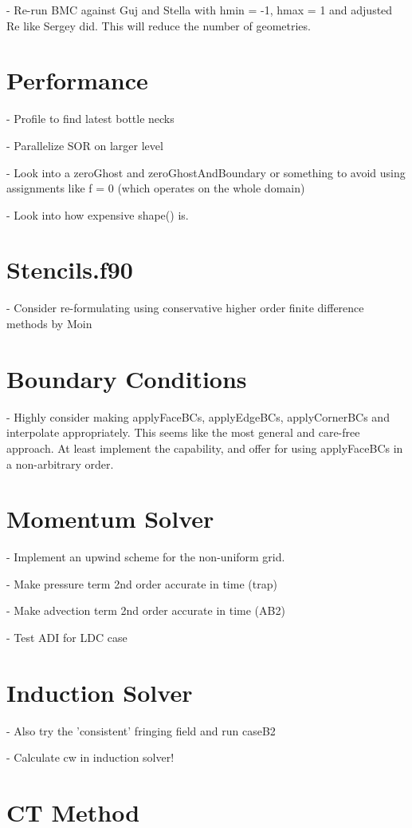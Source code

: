 \documentclass[11pt]{article}
\begin{document}
- Re-run BMC against Guj and Stella with hmin = -1, hmax = 1 and adjusted Re like Sergey
  did. This will reduce the number of geometries.

\section{Performance}
- Profile to find latest bottle necks

- Parallelize SOR on larger level

- Look into a zeroGhost and zeroGhostAndBoundary or something to avoid using assignments like f = 0 (which operates on the whole domain)

- Look into how expensive shape() is.


\section{Stencils.f90}
- Consider re-formulating using conservative higher order finite difference methods by Moin

\section{Boundary Conditions}
- Highly consider making applyFaceBCs, applyEdgeBCs, applyCornerBCs and interpolate appropriately. This seems like the most general and care-free approach. At least implement the capability, and offer for using applyFaceBCs in a non-arbitrary order.

\section{Momentum Solver}

- Implement an upwind scheme for the non-uniform grid.

- Make pressure term 2nd order accurate in time (trap)

- Make advection term 2nd order accurate in time (AB2)

- Test ADI for LDC case


\section{Induction Solver}

- Also try the 'consistent' fringing field and run caseB2

- Calculate cw in induction solver!

\section{CT Method}
\end{document}
